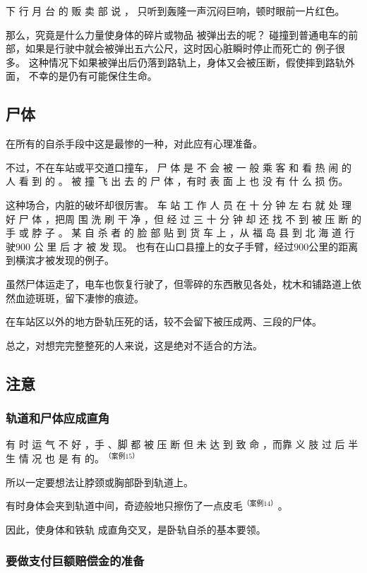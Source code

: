 \documentclass[UTF8]{ctexart}
\begin{document}
下 行 月 台 的 贩 卖 部 说 ， 只听到轰隆一声沉闷巨响，顿时眼前一片红色。

那么，究竟是什么力量使身体的碎片或物品 被弹出去的呢？ 碰撞到普通电车的前部，如果是行驶中就会被弹出五六公尺，这时因心脏瞬时停止而死亡的 例子很多。
这种情况下如果被弹出后仍落到路轨上，身体又会被压断，假使摔到路轨外面， 不幸的是仍有可能保住生命。

\subsection{尸体}

在所有的自杀手段中这是最惨的一种，对此应有心理准备。

不过，不在车站或平交道口撞车， 尸 体 是 不 会 被 一 般 乘 客 和 看 热 闹 的 人 看 到 的 。
被 撞 飞 出 去 的 尸 体 ，有时 表 面 上 也 没 有 什 么 损 伤。

这种场合，内脏的破坏却很厉害。 
车 站 工 作 人 员 在 十 分 钟 左 右 就 处 理 好 尸 体 ，把周 围 洗 刷 干 净 ，但 经 过 三 十 分 钟 却 还 找 不 到 被 压 断 的 手 或 脖 子 。
某 自 杀 者 的 脸 部 贴 到 货 车 上 ，从 福 岛 县 到 北 海 道 行 驶$900$ 公 里 后 才 被 发 现。
也有在山口县撞上的女子手臂，经过$900$公里的距离到横滨才被发现的例子。 

虽然尸体运走了，电车也恢复行驶了，但零碎的东西散见各处，枕木和铺路道上依然血迹斑斑，留下凄惨的痕迹。

在车站区以外的地方卧轨压死的话，较不会留下被压成两、三段的尸体。

总之，对想完完整整死的人来说，这是绝对不适合的方法。

\subsection{注意}

\subsubsection*{轨道和尸体应成直角}

有 时 运 气 不 好 ，手 、脚 都 被 压 断 但 未 达 到 致 命 ，而靠 义 肢 过 后 半 生 情 况 也 是 有 的。$^{（案例15）}$

所以一定要想法让脖颈或胸部卧到轨道上。

有时身体会夹到轨道中间，奇迹般地只擦伤了一点皮毛$^{（案例 14）}$。

因此，使身体和铁轨 成直角交叉，是卧轨自杀的基本要领。 

\subsubsection*{要做支付巨额赔偿金的准备}
\end{document}
